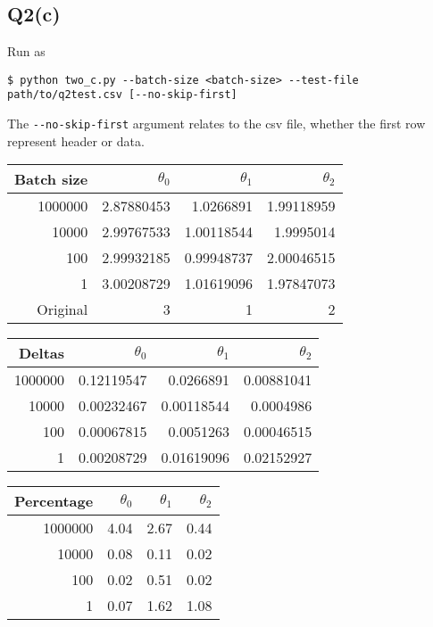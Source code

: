 \documentclass[11pt]{article}
\begin{document}
\subsection{Q2(c)}
\label{sec:orgb9ee740}
\begin{codebox}
Run as
\begin{verbatim}
$ python two_c.py --batch-size <batch-size> --test-file
path/to/q2test.csv [--no-skip-first]
\end{verbatim}
The \verb|--no-skip-first| argument relates to the csv file,
whether the first row represent header or data.
\end{codebox}
\begin{center}
\begin{tabular}{rrrr}
\hline
Batch size & \(\theta_0\) & \(\theta_1\) & \(\theta_2\)\\
\hline
1000000 & 2.87880453 & 1.0266891 & 1.99118959\\
10000 & 2.99767533 & 1.00118544 & 1.9995014\\
100 & 2.99932185 & 0.99948737 & 2.00046515\\
1 & 3.00208729 & 1.01619096 & 1.97847073\\
\hline
Original & 3 & 1 & 2\\
\hline
\end{tabular}
\end{center}

\begin{center}
\begin{tabular}{rrrr}
\hline
Deltas & \(\theta_0\) & \(\theta_1\) & \(\theta_2\)\\
\hline
1000000 & 0.12119547 & 0.0266891 & 0.00881041\\
10000 & 0.00232467 & 0.00118544 & 0.0004986\\
100 & 0.00067815 & 0.0051263 & 0.00046515\\
1 & 0.00208729 & 0.01619096 & 0.02152927\\
\hline
\end{tabular}
\end{center}

\begin{center}
\begin{tabular}{rrrr}
\hline
Percentage & \(\theta_0\) & \(\theta_1\) & \(\theta_2\)\\
\hline
1000000 & 4.04 & 2.67 & 0.44\\
10000 & 0.08 & 0.11 & 0.02\\
100 & 0.02 & 0.51 & 0.02\\
1 & 0.07 & 1.62 & 1.08\\
\hline
\end{tabular}
\end{center}
\end{document}
